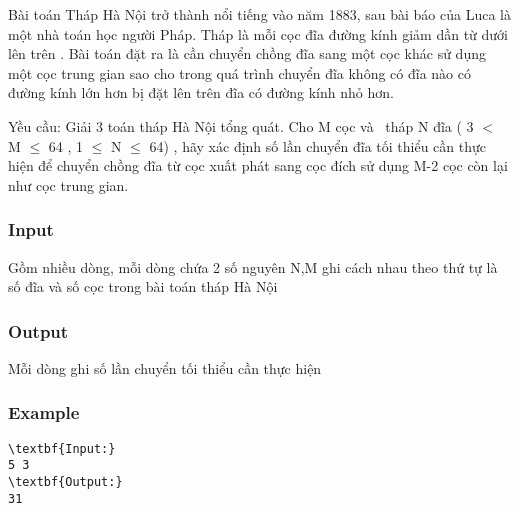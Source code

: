 



   Bài toán Tháp Hà Nội trở thành nổi tiếng vào năm 1883, sau bài báo của Luca là một nhà toán học người Pháp. Tháp là mỗi cọc đĩa đường kính giảm dần từ dưới lên trên . Bài toán đặt ra là cần chuyển chồng đĩa sang một cọc khác sử dụng một cọc trung gian sao cho trong quá trình chuyển đĩa không có đĩa nào có đường kính lớn hơn bị đặt lên trên đĩa có đường kính nhỏ hơn.  

   Yều cầu: Giải 3 toán tháp Hà Nội tổng quát. Cho M cọc và  tháp N đĩa ( 3 $<$ M  $\le$  64 , 1  $\le$  N  $\le$  64) , hãy xác định số lần chuyển đĩa tối thiểu cần thực hiện để chuyển chồng đĩa từ cọc xuất phát sang cọc đích sử dụng M-2 cọc còn lại như cọc trung gian.  

\subsubsection{   Input  }

   Gồm nhiều dòng, mỗi dòng chứa 2 số nguyên N,M ghi cách nhau theo thứ tự là số đĩa và số cọc trong bài toán tháp Hà Nội  

\subsubsection{   Output  }

   Mỗi dòng ghi số lần chuyển tối thiểu cần thực hiện  

\subsubsection{   Example  }
\begin{verbatim}
\textbf{Input:}
5 3
\textbf{Output:}
31\end{verbatim}
